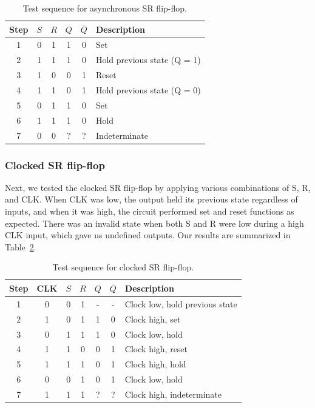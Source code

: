 \documentclass{article}
\begin{document}
\begin{table}[H]
    \centering
    \begin{tabular}{|c|c|c|c|c|l|}
    \hline
    Step & $S$ & $R$ & $Q$ & $\overline{Q}$ & Description \\
    \hline
    1 & 0 & 1 & 1 & 0 & Set \\
    2 & 1 & 1 & 1 & 0 & Hold previous state (Q = 1) \\
    3 & 1 & 0 & 0 & 1 & Reset \\
    4 & 1 & 1 & 0 & 1 & Hold previous state (Q = 0) \\
    5 & 0 & 1 & 1 & 0 & Set \\
    6 & 1 & 1 & 1 & 0 & Hold \\
    7 & 0 & 0 & ? & ? & Indeterminate \\
    \hline
    \end{tabular}
    \caption{Test sequence for asynchronous SR flip-flop.}
    \label{tab:asynch_flipflop}
\end{table}


\subsubsection{Clocked SR flip-flop}

Next, we tested the clocked SR flip-flop by applying various combinations of S, R, and CLK.
When CLK was low, the output held its previous state regardless of inputs, and 
when it was high, the circuit performed set and reset functions as expected.
There was an invalid state when both S and R were low during a high CLK input,
which gave us undefined outputs. Our results are summarized in Table~\ref{tab:clocked_sr}.

\begin{table}[H]
    \centering
    \begin{tabular}{|c|c|c|c|c|c|l|}
    \hline
    Step & CLK & $S$ & $R$ & $Q$ & $\overline{Q}$ & Description \\
    \hline
    1 & 0 & 0 & 1 & - & - & Clock low, hold previous state \\
    2 & 1 & 0 & 1 & 1 & 0 & Clock high, set \\
    3 & 0 & 1 & 1 & 1 & 0 & Clock low, hold \\
    4 & 1 & 1 & 0 & 0 & 1 & Clock high, reset \\
    5 & 1 & 1 & 1 & 0 & 1 & Clock high, hold \\
    6 & 0 & 0 & 1 & 0 & 1 & Clock low, hold \\
    7 & 1 & 1 & 1 & ? & ? & Clock high, indeterminate \\
    \hline
    \end{tabular}
    \caption{Test sequence for clocked SR flip-flop.}
    \label{tab:clocked_sr}
\end{table}
\end{document}
